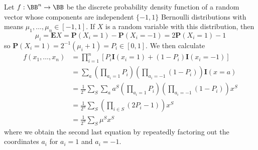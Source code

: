 \begin{example}
    Let $f: \BB^n \to \BB$ be the discrete probability density function of a random vector whose components are independent $\{ -1, 1 \}$ Bernoulli distributions with means $\mu_1, \dots, \mu_n \in [-1,1]$. If $X$ is a random variable with this distribution, then
    \[ \mu_i = \mathbf{E}X = \mathbf{P}(X_i = 1) - \mathbf{P}(X_i = -1) = 2 \mathbf{P}(X_i = 1) - 1 \]
    so $\mathbf{P}(X_i = 1) = 2^{-1} (\mu_i + 1) = P_i \in [0,1]$. We then calculate
    \begin{align*}
        f(x_1, \dots, x_n) &= \prod_{i = 1}^n \left[ P_i \mathbf{I}(x_i = 1) + (1 - P_i) \mathbf{I}(x_i = -1) \right]\\
        &= \sum_a \left( \prod_{a_i = 1} P_i \right) \left( \prod_{a_i = -1} (1 - P_i) \right) \mathbf{I}(x = a)\\
        &= \frac{1}{2^n} \sum_S \sum_a a^S \left( \prod_{a_i = 1} P_i \right) \left( \prod_{a_i = -1} (1 - P_i) \right) x^S\\
        &= \frac{1}{2^n} \sum_S \left( \prod_{i \in S} (2P_i - 1) \right) x^S\\
        &= \frac{1}{2^n} \sum_S \mu^S x^S
    \end{align*}
    where we obtain the second last equation by repeatedly factoring out the coordinates $a_i$ for $a_i = 1$ and $a_i = -1$.
\end{example}

